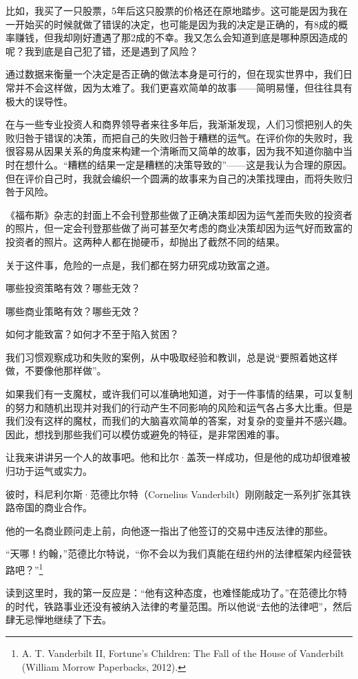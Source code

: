 比如，我买了一只股票，5年后这只股票的价格还在原地踏步。这可能是因为我在一开始买的时候就做了错误的决定，也可能是因为我的决定是正确的，有8成的概率赚钱，但我却刚好遭遇了那2成的不幸。我又怎么会知道到底是哪种原因造成的呢？我到底是自己犯了错，还是遇到了风险？

通过数据来衡量一个决定是否正确的做法本身是可行的，但在现实世界中，我们日常并不会这样做，因为太难了。我们更喜欢简单的故事——简明易懂，但往往具有极大的误导性。

在与一些专业投资人和商界领导者来往多年后，我渐渐发现，人们习惯把别人的失败归咎于错误的决策，而把自己的失败归咎于糟糕的运气。在评价你的失败时，我很容易从因果关系的角度来构建一个清晰而又简单的故事，因为我不知道你脑中当时在想什么。“糟糕的结果一定是糟糕的决策导致的”——这是我认为合理的原因。但在评价自己时，我就会编织一个圆满的故事来为自己的决策找理由，而将失败归咎于风险。

《福布斯》杂志的封面上不会刊登那些做了正确决策却因为运气差而失败的投资者的照片，但一定会刊登那些做了尚可甚至欠考虑的商业决策却因为运气好而致富的投资者的照片。这两种人都在抛硬币，却抛出了截然不同的结果。

关于这件事，危险的一点是，我们都在努力研究成功致富之道。

哪些投资策略有效？哪些无效？

哪些商业策略有效？哪些无效？

如何才能致富？如何才不至于陷入贫困？

我们习惯观察成功和失败的案例，从中吸取经验和教训，总是说“要照着她这样做，不要像他那样做”。

如果我们有一支魔杖，或许我们可以准确地知道，对于一件事情的结果，可以复制的努力和随机出现并对我们的行动产生不同影响的风险和运气各占多大比重。但是我们没有这样的魔杖，而我们的大脑喜欢简单的答案，对复杂的变量并不感兴趣。因此，想找到那些我们可以模仿或避免的特征，是非常困难的事。

让我来讲讲另一个人的故事吧。他和比尔·盖茨一样成功，但是他的成功却很难被归功于运气或实力。

彼时，科尼利尔斯·范德比尔特（Cornelius Vanderbilt）刚刚敲定一系列扩张其铁路帝国的商业合作。

他的一名商业顾问走上前，向他逐一指出了他签订的交易中违反法律的那些。

“天哪！约翰，”范德比尔特说，“你不会以为我们真能在纽约州的法律框架内经营铁路吧？”\footnote{A. T. Vanderbilt II, Fortune’s Children: The Fall of the House of Vanderbilt (William Morrow Paperbacks, 2012).}

读到这里时，我的第一反应是：“他有这种态度，也难怪能成功了。”在范德比尔特的时代，铁路事业还没有被纳入法律的考量范围。所以他说“去他的法律吧”，然后肆无忌惮地继续了下去。

